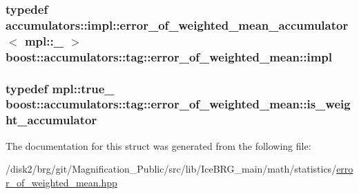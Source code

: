 \subsubsection[{impl}]{\setlength{\rightskip}{0pt plus 5cm}typedef {\bf accumulators\+::impl\+::error\+\_\+of\+\_\+weighted\+\_\+mean\+\_\+accumulator}$<$ mpl\+::\+\_ $>$ {\bf boost\+::accumulators\+::tag\+::error\+\_\+of\+\_\+weighted\+\_\+mean\+::impl}}\label{structboost_1_1accumulators_1_1tag_1_1error__of__weighted__mean_a9e77d0056f0d9b30589fbf40c57cf25d}
\hypertarget{structboost_1_1accumulators_1_1tag_1_1error__of__weighted__mean_a2e976c79a2aa15620a504bd4c87ee9bf}{}
\subsubsection[{is\+\_\+weight\+\_\+accumulator}]{\setlength{\rightskip}{0pt plus 5cm}typedef mpl\+::true\+\_\+ {\bf boost\+::accumulators\+::tag\+::error\+\_\+of\+\_\+weighted\+\_\+mean\+::is\+\_\+weight\+\_\+accumulator}}\label{structboost_1_1accumulators_1_1tag_1_1error__of__weighted__mean_a2e976c79a2aa15620a504bd4c87ee9bf}


The documentation for this struct was generated from the following file\+:\begin{DoxyCompactItemize}
\item 
/disk2/brg/git/\+Magnification\+\_\+\+Public/src/lib/\+Ice\+B\+R\+G\+\_\+main/math/statistics/\hyperlink{error__of__weighted__mean_8hpp}{error\+\_\+of\+\_\+weighted\+\_\+mean.\+hpp}\end{DoxyCompactItemize}
